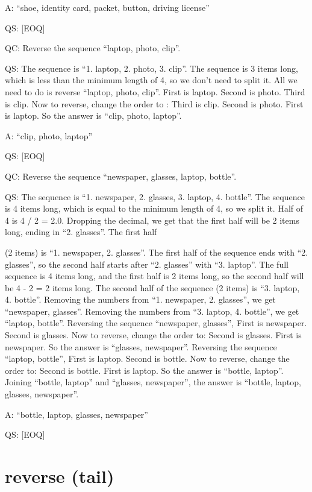 \documentclass[
]{article}
\begin{document}
A: ``shoe, identity card, packet, button, driving license''

QS: {[}EOQ{]}

QC: Reverse the sequence ``laptop, photo, clip''.

QS: The sequence is ``1. laptop, 2. photo, 3. clip''. The sequence is 3
items long, which is less than the minimum length of 4, so we don't need
to split it. All we need to do is reverse ``laptop, photo, clip''. First
is laptop. Second is photo. Third is clip. Now to reverse, change the
order to : Third is clip. Second is photo. First is laptop. So the
answer is ``clip, photo, laptop''.

A: ``clip, photo, laptop''

QS: {[}EOQ{]}

QC: Reverse the sequence ``newspaper, glasses, laptop, bottle''.

QS: The sequence is ``1. newspaper, 2. glasses, 3. laptop, 4. bottle''.
The sequence is 4 items long, which is equal to the minimum length of 4,
so we split it. Half of 4 is 4 / 2 = 2.0. Dropping the decimal, we get
that the first half will be 2 items long, ending in ``2. glasses''. The
first half

(2 items) is ``1. newspaper, 2. glasses''. The first half of the
sequence ends with ``2. glasses'', so the second half starts after ``2.
glasses'' with ``3. laptop''. The full sequence is 4 items long, and the
first half is 2 items long, so the second half will be 4 - 2 = 2 items
long. The second half of the sequence (2 items) is ``3. laptop, 4.
bottle''. Removing the numbers from ``1. newspaper, 2. glasses'', we get
``newspaper, glasses''. Removing the numbers from ``3. laptop, 4.
bottle'', we get ``laptop, bottle''. Reversing the sequence ``newspaper,
glasses'', First is newspaper. Second is glasses. Now to reverse, change
the order to: Second is glasses. First is newspaper. So the answer is
``glasses, newspaper''. Reversing the sequence ``laptop, bottle'', First
is laptop. Second is bottle. Now to reverse, change the order to: Second
is bottle. First is laptop. So the answer is ``bottle, laptop''. Joining
``bottle, laptop'' and ``glasses, newspaper'', the answer is ``bottle,
laptop, glasses, newspaper''.

A: ``bottle, laptop, glasses, newspaper''

QS: {[}EOQ{]}

\section{reverse (tail)}\label{reverse-tail}
\end{document}
